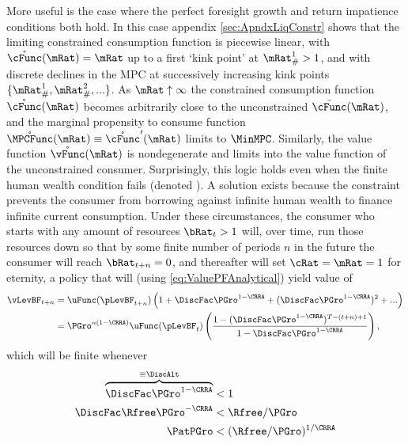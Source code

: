 \documentclass[./BufferStockTheory.tex]{subfiles}
\begin{document}
More useful is the case where the perfect foresight growth and return impatience conditions both hold.  In this case appendix \ref{sec:ApndxLiqConstr} shows that the limiting constrained consumption function is piecewise linear, with $\mathring{\cFunc}(\mRat)=\mRat$ up to a first `kink point' at $\mRat_{\#}^{1}>1$, and with discrete declines in the MPC at successively increasing kink points $\{\mRat_{\#}^{1},\mRat_{\#}^{2},...\}$.  As $\mRat \uparrow \infty$ the constrained consumption function $\mathring{\cFunc}(\mRat)$ becomes arbitrarily close to the unconstrained $\bar{\cFunc}(\mRat)$, and the marginal propensity to consume function $\mathring{\MPCFunc}(\mRat) \equiv \mathring{\cFunc}^{\prime}(\mRat)$ limits to $\MinMPC$.  Similarly, the value function $\mathring{\vFunc}(\mRat)$ is nondegenerate and limits into the value function of the unconstrained consumer.  Surprisingly, this logic holds even when the finite human wealth condition fails (denoted \cncl{\FHWC}).  A solution exists because the constraint prevents the consumer from borrowing against infinite human wealth to finance infinite current consumption.  Under these circumstances, the consumer who starts with any amount of resources $\bRat_{t} > 1$ will, over time, run those resources down so that by some finite number of periods $n$ in the future the consumer will reach $\bRat_{t+n} = 0$, and thereafter will set $\cRat = \mRat = 1$ for eternity, a policy that will (using \eqref{eq:ValuePFAnalytical}) yield value of \hypertarget{PFFVAC}{}
\begin{equation}\begin{gathered}\begin{aligned}
  \vLevBF_{t+n}  & = \uFunc(\pLevBF_{t+n})\left(1+\DiscFac
    \PGro^{1-\CRRA}+(\DiscFac \PGro^{1-\CRRA})^{2}+...\right) \notag
  \\  & = \PGro^{n(1-\CRRA)} \uFunc(\pLevBF_{t})\left(\frac{1-(\DiscFac
      \PGro^{1-\CRRA})^{T-(t+n)+1}}{1-\DiscFac \PGro^{1-\CRRA}}\right),
  \notag
\end{aligned}\end{gathered}\end{equation}
which will be finite whenever 
\begin{equation}\begin{gathered}\begin{aligned}
   \overbrace{\DiscFac \PGro^{1-\CRRA} }^{\equiv \DiscAlt}  & < 1 \label{eq:PFFVAC}
\\ \DiscFac \Rfree \PGro^{-\CRRA}  & < \Rfree/\PGro \nonumber
\\ \PatPGro  & < (\Rfree/\PGro)^{1/\CRRA} \nonumber
\end{aligned}\end{gathered}\end{equation}
\end{document}
